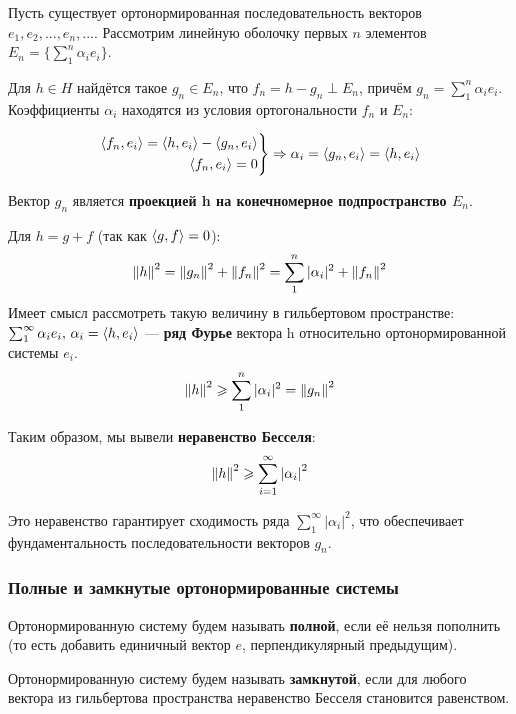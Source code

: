 \documentclass[12pt]{article}
\begin{document}
			Пусть существует ортонормированная последовательность векторов $e_1, e_2, ..., e_n, ...$.
			Рассмотрим линейную оболочку первых $n$ элементов $E_n = \{ \sum_1^n \alpha_i e_i \}$.

			Для $h \in H$ найдётся такое $g_n \in E_n$, что $f_n = h - g_n \perp E_n$, причём 
			$g_n = \sum_1^n \alpha_i e_i$. Коэффициенты $\alpha_i$ находятся из условия ортогональности $f_n$ и $E_n$:

			$$
		    	\left.
			    \begin{aligned}
			        \left\langle f_n, e_i \right\rangle = \left\langle h, e_i \right\rangle - \left\langle g_n, e_i \right\rangle \\
			        \left\langle f_n, e_i \right\rangle = 0
		    	\end{aligned}
			    \right\} \Rightarrow \alpha_i = \left\langle g_n, e_i \right\rangle = \left\langle h, e_i \right\rangle
			$$

			Вектор $g_n$ является \textbf{проекцией h на конечномерное подпространство $E_n$}.

			Для $h = g + f$ (так как $\left\langle g, f \right\rangle = 0$):
			$$ \left\| h \right\|^2 = \left\| g_n \right\|^2 + \left\| f_n \right\|^2 = \sum_1^n |\alpha_i|^2 + \left\| f_n \right\|^2$$
			Имеет смысл рассмотреть такую величину в гильбертовом пространстве: 
			$\sum_1^{\infty} \alpha_i e_i,\, \alpha_i = \left\langle h, e_i \right\rangle$ --- \textbf{ряд Фурье} вектора h относительно ортонормированной системы $e_i$.
			$$ \left\| h \right\|^2 \geqslant \sum_1^n |\alpha_i|^2 = \left\| g_n \right\|^2 $$
	
			Таким образом, мы вывели \textbf{неравенство Бесселя}:
			$$ \left\| h \right\|^2 \geqslant \sum_{i=1}^{\infty} \left| \alpha_i \right|^2 $$

			Это неравенство гарантирует сходимость ряда $\sum_1^{\infty} |\alpha_i|^2$, что обеспечивает
			фундаментальность последовательности векторов $g_n$.

		\subsubsection{Полные и замкнутые ортонормированные системы}

			\begin{defi}
				Ортонормированную систему будем называть \textbf{полной}, если её нельзя пополнить 
				(то есть добавить единичный вектор $e$, перпендикулярный предыдущим).
			\end{defi}

			\begin{defi}
				Ортонормированную систему будем называть \textbf{замкнутой}, если для любого вектора из 
				гильбертова пространства неравенство Бесселя становится равенством.
			\end{defi}
\end{document}
